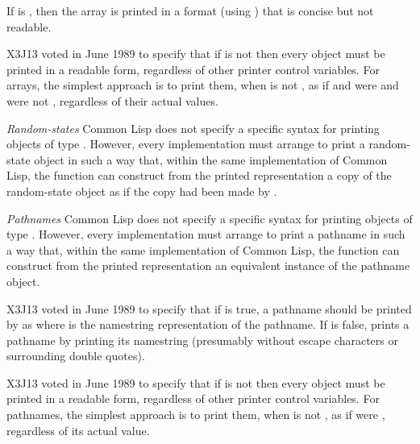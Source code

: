 \begin{flushdesc}
\begin{obsolete}
If  is {\false}, then the array is printed
in a format (using \cd{\#<}) that is concise but not readable.
\end{obsolete}
\begin{newer}
X3J13 voted in June 1989  to specify that if 
is not {\false} then every object must be printed in a readable form,
regardless of other printer control variables.  For arrays, the simplest approach
is to print them, when  is not {\false}, as if 
and  were {\false} and  were not {\false},
regardless of their actual values.
\end{newer}

\item[{\it Random-states}]
Common Lisp does not specify a specific syntax
for printing objects of type .  However, every implementation
must arrange to print a random-state object in such a way that,
within the same implementation of Common Lisp, the function 
can construct from the printed representation a copy of the random-state
object as if the copy had been made by .

\begin{obsolete}
\item[{\it Pathnames}]
Common Lisp does not specify a specific syntax
for printing objects of type .  However, every implementation
must arrange to print a pathname in such a way that,
within the same implementation of Common Lisp, the function 
can construct from the printed representation an equivalent
instance of the pathname object.
\end{obsolete}

\begin{newer}
X3J13 voted in June 1989 
to specify that if  is true, a pathname
should be printed by  as  where  is the
namestring representation of the pathname.  If 
is false,  prints a pathname by printing its namestring
(presumably without escape characters or surrounding double quotes).
\end{newer}
\begin{newer}
X3J13 voted in June 1989  to specify that if 
is not {\false} then every object must be printed in a readable form,
regardless of other printer control variables.  For pathnames, the simplest approach
is to print them, when  is not {\false}, as if 
were {\false},
regardless of its actual value.
\end{newer}
\end{flushdesc}

